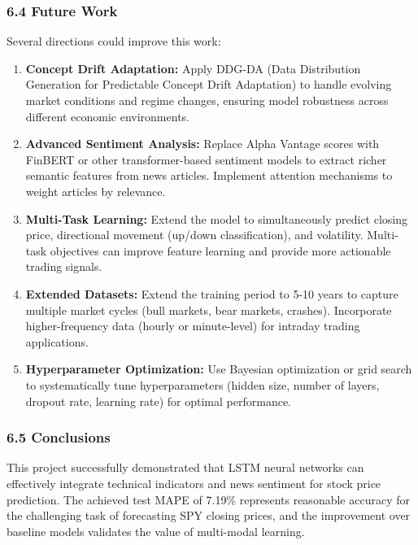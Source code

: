 \documentclass[
]{article}
\begin{document}
\subsubsection{6.4 Future Work}\label{64-future-work}

Several directions could improve this work:

\begin{enumerate}
\def\labelenumi{\arabic{enumi}.}

\item \textbf{Concept Drift Adaptation:} Apply DDG-DA (Data Distribution Generation for Predictable Concept Drift Adaptation) to handle evolving market conditions and regime changes, ensuring model robustness across different economic environments.

\item \textbf{Advanced Sentiment Analysis:} Replace Alpha Vantage scores with FinBERT or other transformer-based sentiment models to extract richer semantic features from news articles. Implement attention mechanisms to weight articles by relevance.
\item \textbf{Multi-Task Learning:} Extend the model to simultaneously predict closing price, directional movement (up/down classification), and volatility. Multi-task objectives can improve feature learning and provide more actionable trading signals.


\item \textbf{Extended Datasets:} Extend the training period to 5-10 years to capture multiple market cycles (bull markets, bear markets, crashes). Incorporate higher-frequency data (hourly or minute-level) for intraday trading applications.


\item \textbf{Hyperparameter Optimization:} Use Bayesian optimization or grid search to systematically tune hyperparameters (hidden size, number of layers, dropout rate, learning rate) for optimal performance.
\end{enumerate}

\subsubsection{6.5 Conclusions}\label{65-conclusions}

This project successfully demonstrated that LSTM neural networks can
effectively integrate technical indicators and news sentiment for stock
price prediction. The achieved test MAPE of 7.19\% represents reasonable
accuracy for the challenging task of forecasting SPY closing prices, and
the improvement over baseline models validates the value of multi-modal
learning.
\end{document}
